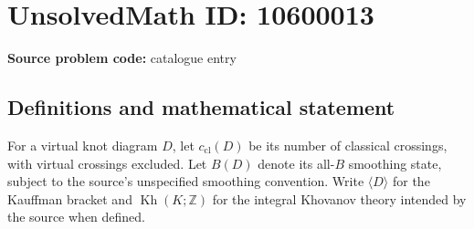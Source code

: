 \documentclass[11pt]{article}
\newcommand{\Z}{\mathbb{Z}}
\begin{document}
\section*{UnsolvedMath ID: 10600013}
\textbf{Source problem code:} catalogue entry
\subsection{Definitions and mathematical statement}
For a virtual knot diagram \(D\), let \(c_{\mathrm{cl}}(D)\) be its number of classical crossings, with virtual crossings excluded. Let \(B(D)\) denote its all-\(B\) smoothing state, subject to the source's unspecified smoothing convention. Write \(\langle D\rangle\) for the Kauffman bracket and \(\operatorname{Kh}(K;\Z)\) for the integral Khovanov theory intended by the source when defined.
\end{document}
